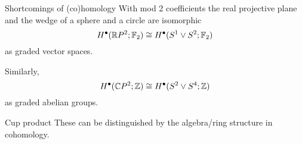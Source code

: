 \begin{frame}{Shortcomings of (co)homology}
	\pause With mod 2 coefficients the real projective plane and the wedge of a sphere and a circle are isomorphic
	\[
	H^\bullet(\mathbb{R} P^2; {\mathbb{F}_2}) \cong H^\bullet(S^1 \vee S^2; {\mathbb{F}_2})
	\]
	as graded vector spaces.

	\bigskip\pause
	Similarly,
	\[
	H^\bullet(\mathbb{C} P^2; \mathbb{Z}) \cong H^\bullet(S^2 \vee S^4; \mathbb{Z})
	\]
	as graded abelian groups.

	\bigskip\pause
	\begin{block}{Cup product}
		These can be distinguished by the algebra/ring structure in cohomology.
	\end{block}
\end{frame}